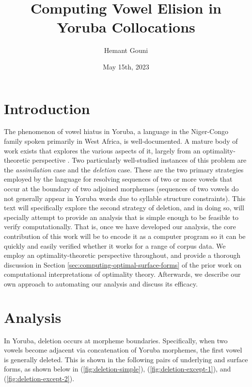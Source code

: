 \documentclass[12pt]{article}
\title{Computing Vowel Elision in Yoruba Collocations}
\author{Hemant Gouni}
\date{May 15th, 2023}
\newcommand{\pref}[1]{(\ref{#1})}
\begin{document}
\maketitle

\section{Introduction}

The phenomenon of vowel hiatus in Yoruba, a language in the Niger-Congo family
spoken primarily in West Africa, is well-documented. A mature body of work
exists that explores the various aspects of it, largely from an
optimality-theoretic perspective \cite{ola2002yoruba, seidl2000yoruba,
pulleyblank1988vowel}. Two particularly well-studied instances of this problem
are the \textit{assimilation} case and the \textit{deletion} case. These are the
two primary strategies employed by the language for resolving sequences of two
or more vowels that occur at the boundary of two adjoined morphemes
(sequences of two vowels do not generally appear in Yoruba words due to
syllable structure constraints). This text will specifically explore the
second strategy of deletion, and in doing so, will specially attempt to provide
an analysis that is simple enough to be feasible to verify computationally. That
is, once we have developed our analysis, the core contribution of this work
will be to encode it as a computer program so it can be quickly and easily
verified whether it works for a range of corpus data. We employ an
optimality-theoretic perspective throughout, and provide a thorough discussion
in Section \ref{sec:computing-optimal-surface-forms} of the prior work on
computational interpretations of optimality theory. Afterwards, we describe
our own approach to automating our analysis and discuss its efficacy.

\section{Analysis}

In Yoruba, deletion occurs at morpheme boundaries. Specifically, when two
vowels become adjacent via concatenation of Yoruba morphemes, the first vowel
is generally deleted. This is shown in the following pairs of underlying and
surface forms, as shown below in \pref{fig:deletion-simple},
\pref{fig:deletion-except-1}, and \pref{fig:deletion-except-2}.
\end{document}
